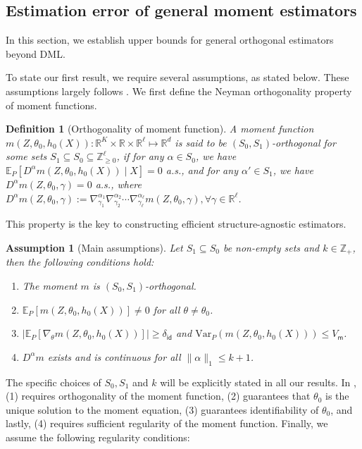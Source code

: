 \documentclass{article}
\newcommand{\E}{\mathbb{E}}
\newcommand{\R}{\mathbb{R}}
\newtheorem{assumption}{Assumption}[section]
\newtheorem{definition}{Definition}[section]
\begin{document}
\subsection{Estimation error of general moment estimators}
In this section, we establish upper bounds for general orthogonal estimators beyond DML.

To state our first result, we require several assumptions, as stated below. These assumptions largely follows \citep{mackey2018orthogonal}. We first define the Neyman orthogonality property of moment functions. 

\begin{definition}[Orthogonality of moment function]
    \label{def:s-ortho}
    A moment function $m(Z,\theta_0,h_0(X)):\R^K\times\R\times\R^{\ell}\mapsto\R^d$ is said to be $(S_0,S_1)$-orthogonal for some sets $S_1\subseteq S_0\subseteq\mathbb{Z}_{\geq 0}^\ell$, if for any $\alpha\in S_0$, we have $\E_{P}\left[ D^{\alpha} m(Z,\theta_0,h_0(X)) \mid X \right] = 0$ a.s., and for any $\alpha'\in S_1$, we have $D^{\alpha} m(Z,\theta_0,\gamma) = 0$ a.s., where $D^{\alpha}m(Z,\theta_0,\gamma) := \nabla_{\gamma_1}^{\alpha_1}\nabla_{\gamma_2}^{\alpha_2}\cdots\nabla_{\gamma_\ell}^{\alpha_\ell}m(Z,\theta_0,\gamma), \forall \gamma\in\R^\ell$.
\end{definition}

This property is the key to constructing efficient structure-agnostic estimators.

\begin{assumption}[Main assumptions]
    \label{asmp:main}
    Let $S_1\subseteq S_0$ be non-empty sets and $k \in\mathbb{Z}_+$, then the following conditions hold:
    \begin{enumerate}[(1).]
        \item The moment $m$ is $(S_0,S_1)$-orthogonal. \quad
        \item $\E_{P}[m(Z,\theta_0,h_0(X))]\neq 0$ for all $\theta\neq\theta_0$.\quad
        \item $\big|\E_{P}[\nabla_{\theta}m(Z,\theta_0,h_0(X))]\big|\geq \delta_{\mathsf{id}}$ and $\mathrm{Var}_{P}\left(m(Z,\theta_0,h_0(X))\right) \leq V_{\mathsf{m}}$.\quad
        \item $D^{\alpha}m$ exists and is continuous for all $\|\alpha\|_1\leq k+1$.
    \end{enumerate}
\end{assumption}

The specific choices of $S_0,S_1$ and $k$ will be explicitly stated in all our results. In , (1) requires orthogonality of the moment function, (2) guarantees that $\theta_0$ is the unique solution to the moment equation, (3) guarantees identifiability of $\theta_0$, and lastly, (4) requires sufficient regularity of the moment function. Finally, we assume the following regularity conditions:
\end{document}
